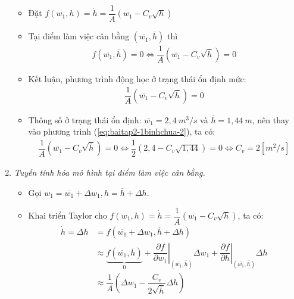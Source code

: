 \begin{enumerate}[\it a.]
\begin{itemize}
                \item Đặt $f\left({w_1, h}\right) = \dot{h} = \dfrac{1}{A} \left({w_1 - C_v\sqrt{h}}\right)$

                \item Tại điểm làm việc cân bằng $\left({\overline{w_1}, \overline{h}}\right)$ thì
                    \begin{align}
                        f\left({\overline{w_1}, \overline{h}}\right) = 0 \Longleftrightarrow \dfrac{1}{A} \left({\overline{w_1} - C_v\sqrt{\overline{h}}}\right) = 0
                    \end{align}

                \item Kết luận, phương trình động học ở trạng thái ổn định mức:
                    \begin{align} \label{eq:baitap2-1binhchua-2}
                        \dfrac{1}{A} \left({\overline{w_1} - C_v\sqrt{\overline{h}}}\right) = 0
                    \end{align}

                \item Thông số ở trạng thái ổn định: $\overline{w_1} = 2,4~m^3/s$ và $\overline{h} = 1,44~m$, nên thay vào phương trình (\ref{eq:baitap2-1binhchua-2}), ta có:
                    \begin{align}
                        \dfrac{1}{A} \left({\overline{w_1} - C_v\sqrt{\overline{h}}}\right) = 0 \Longleftrightarrow \dfrac{1}{2} \left({2,4 - C_v\sqrt{1,44}}\right) = 0 \Longleftrightarrow C_v = 2[m^2/s]
                    \end{align}
            \end{itemize}

        \item \textit{Tuyến tính hóa mô hình tại điểm làm việc cân bằng.}
            \begin{itemize}
                \item Gọi $w_1 = \overline{w_1} + \Delta w_1, h = \overline{h} + \Delta h$.

                \item Khai triển Taylor cho $f \left({w_1, h}\right) = \dot{h} = \dfrac{1}{A} \left({w_1 - C_v\sqrt{h}}\right)$, ta có:
                    \begin{align}
                        \dot{h} = \Delta h & = f\left({\overline{w_1} + \Delta w_1, \overline{h} + \Delta h}\right) \\
                        & \approx \underbrace{f \left({\overline{w_1}, \overline{h}}\right)}_{0} + \left.\dfrac{\partial f}{\partial w_1}\right|_{\left({\overline{w_1}, \overline{h}}\right)} \Delta w_1 + \left.\dfrac{\partial f}{\partial h}\right|_{\left({\overline{w_1}, \overline{h}}\right)} \Delta h\\
                        & \approx \dfrac{1}{A} \left({\Delta w_1 - \dfrac{C_v}{2 \sqrt{\overline{h}}} \Delta h}\right)
                    \end{align}


\end{itemize}
\end{enumerate}

